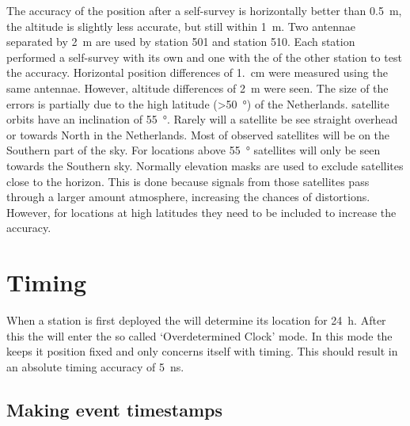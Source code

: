 The accuracy of the position after a self-survey is horizontally better than \SI{0.5}{\meter}, the altitude is slightly less accurate, but still within \SI{1}{\meter}. Two \gps antennae separated by \SI{2}{\meter} are used by station 501 and station 510. Each station performed a self-survey with its own \gps and one with the \gps of the other station to test the accuracy. Horizontal position differences of \SI{1.}{\centi\meter} were measured using the same \gps antennae. However, altitude differences of \SI{2}{\meter} were seen. The size of the errors is partially due to the high latitude (\SI{>50}{\degree}) of the Netherlands. \gps satellite orbits have an inclination of \SI{55}{\degree}. Rarely will a satellite be see straight overhead or towards North in the Netherlands. Most of observed satellites will be on the Southern part of the sky. For locations above \SI{55}{\degree} satellites will only be seen towards the Southern sky. Normally elevation masks are used to exclude \gps satellites close to the horizon. This is done because signals from those satellites pass through a larger amount atmosphere, increasing the chances of distortions. However, for locations at high latitudes they need to be included to increase the accuracy.

%


\section{Timing}

When a \hisparc station is first deployed the \gps will determine its location for \SI{24}{\hour}. After this the \gps will enter the so called `Overdetermined Clock' mode. In this mode the \gps keeps it position fixed and only concerns itself with timing. This should result in an absolute timing accuracy of \SI{5}{\ns}.


\subsection{Making event timestamps}
\label{sub:gps_timestamps}

